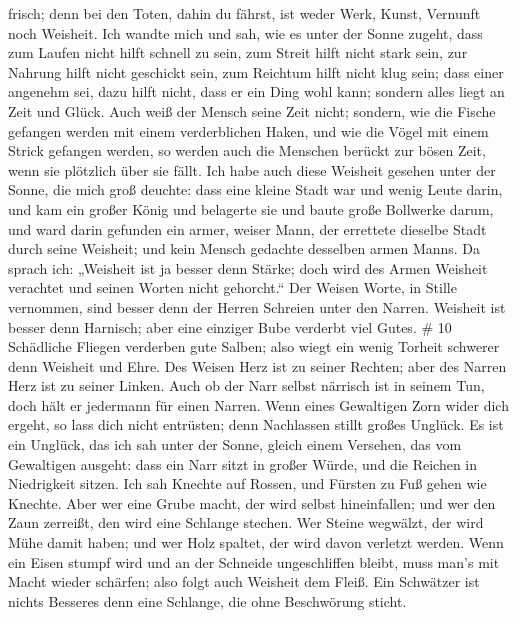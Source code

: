 frisch; denn bei den Toten, dahin du fährst, ist weder Werk, Kunst,
Vernunft noch Weisheit.  Ich wandte mich und sah, wie es
unter der Sonne zugeht, dass zum Laufen nicht hilft schnell zu sein, zum
Streit hilft nicht stark sein, zur Nahrung hilft nicht geschickt sein,
zum Reichtum hilft nicht klug sein; dass einer angenehm sei, dazu hilft
nicht, dass er ein Ding wohl kann; sondern alles liegt an Zeit und
Glück.  Auch weiß der Mensch seine Zeit nicht; sondern, wie
die Fische gefangen werden mit einem verderblichen Haken, und wie die
Vögel mit einem Strick gefangen werden, so werden auch die Menschen
berückt zur bösen Zeit, wenn sie plötzlich über sie fällt. 
Ich habe auch diese Weisheit gesehen unter der Sonne, die mich groß
deuchte:  dass eine kleine Stadt war und wenig Leute darin,
und kam ein großer König und belagerte sie und baute große Bollwerke
darum,  und ward darin gefunden ein armer, weiser Mann, der
errettete dieselbe Stadt durch seine Weisheit; und kein Mensch gedachte
desselben armen Manns.  Da sprach ich: „Weisheit ist ja
besser denn Stärke; doch wird des Armen Weisheit verachtet und seinen
Worten nicht gehorcht.``  Der Weisen Worte, in Stille
vernommen, sind besser denn der Herren Schreien unter den Narren.
 Weisheit ist besser denn Harnisch; aber eine einziger Bube
verderbt viel Gutes. \# 10  Schädliche Fliegen verderben
gute Salben; also wiegt ein wenig Torheit schwerer denn Weisheit und
Ehre.  Des Weisen Herz ist zu seiner Rechten; aber des
Narren Herz ist zu seiner Linken.  Auch ob der Narr selbst
närrisch ist in seinem Tun, doch hält er jedermann für einen Narren.
 Wenn eines Gewaltigen Zorn wider dich ergeht, so lass dich
nicht entrüsten; denn Nachlassen stillt großes Unglück.  Es
ist ein Unglück, das ich sah unter der Sonne, gleich einem Versehen, das
vom Gewaltigen ausgeht:  dass ein Narr sitzt in großer
Würde, und die Reichen in Niedrigkeit sitzen.  Ich sah
Knechte auf Rossen, und Fürsten zu Fuß gehen wie Knechte. 
Aber wer eine Grube macht, der wird selbst hineinfallen; und wer den
Zaun zerreißt, den wird eine Schlange stechen.  Wer Steine
wegwälzt, der wird Mühe damit haben; und wer Holz spaltet, der wird
davon verletzt werden.  Wenn ein Eisen stumpf wird und an
der Schneide ungeschliffen bleibt, muss man's mit Macht wieder schärfen;
also folgt auch Weisheit dem Fleiß.  Ein Schwätzer ist
nichts Besseres denn eine Schlange, die ohne Beschwörung sticht.
